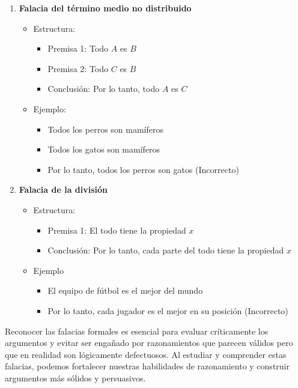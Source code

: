 \begin{enumerate}
	\item \textbf{Falacia del término medio no distribuido} 
	\begin{itemize}
		\item Estructura:
		\begin{itemize}[itemsep=-5pt]
			\item Premisa 1: Todo $A$ es $B$
			\item Premisa 2: Todo $C$ es $B$
			\item Conclusión: Por lo tanto, todo $A$ es $C$
		\end{itemize}
		\item Ejemplo:
		\begin{itemize}[itemsep=-5pt]
			\item Todos los perros son mamíferos
			\item Todos los gatos son mamíferos
			\item Por lo tanto, todos los perros son gatos (Incorrecto)
		\end{itemize}
	\end{itemize}
	
	\item \textbf{Falacia de la división} 
	\begin{itemize}
		\item Estructura:
		\begin{itemize}[itemsep=-5pt]
			\item Premisa 1: El todo tiene la propiedad $x$
			\item Conclusión: Por lo tanto, cada parte del todo tiene la propiedad $x$
		\end{itemize}
		\item Ejemplo
		\begin{itemize}[itemsep=-5pt]
			\item El equipo de fútbol es el mejor del mundo
			\item Por lo tanto, cada jugador es el mejor en su posición (Incorrecto)
		\end{itemize}
	\end{itemize}
\end{enumerate}

Reconocer las falacias formales es esencial para evaluar críticamente los argumentos y evitar ser engañado por razonamientos que parecen válidos pero que en realidad son lógicamente defectuosos. Al estudiar y comprender estas falacias, podemos fortalecer nuestras habilidades de razonamiento y construir argumentos más sólidos y persuasivos.


